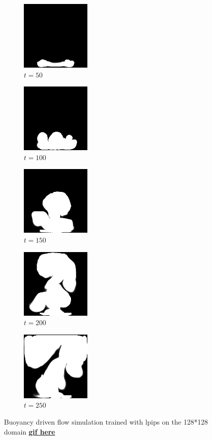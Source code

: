 \documentclass[a4paper,12pt,twoside]{report}
\begin{document}
\begin{figure}
	\centering
	\begin{subfigure}{0.18\textwidth}
		\centering
		\includegraphics[scale=0.56]{buoyancy_test/dens_000050_lpips.png}
		\caption{$t=50$}
	\end{subfigure}
	\begin{subfigure}{0.18\textwidth}
		\centering
		\includegraphics[scale=0.56]{buoyancy_test/dens_000100_lpips.png}
		\caption{$t=100$}
	\end{subfigure}
	\begin{subfigure}{0.18\textwidth}
		\centering
		\includegraphics[scale=0.56]{buoyancy_test/dens_000150_lpips.png}
		\caption{$t=150$}
	\end{subfigure}
	\begin{subfigure}{0.18\textwidth}
		\centering
		\includegraphics[scale=0.56]{buoyancy_test/dens_000200_lpips.png}
		\caption{$t=200$}
	\end{subfigure}
	\begin{subfigure}{0.18\textwidth}
		\centering
		\includegraphics[scale=0.56]{buoyancy_test/dens_000249_lpips.png}
		\caption{$t=250$}
	\end{subfigure}
	\caption{Buoyancy driven flow simulation trained with lpips on the 128*128 domain \href{https://github.com/w191444052/sol-data/blob/master/buoyancy_high/lpips.gif}{\bf{gif here}}}
	\label{sol buoyancy high lpips}
\end{figure}
\end{document}
